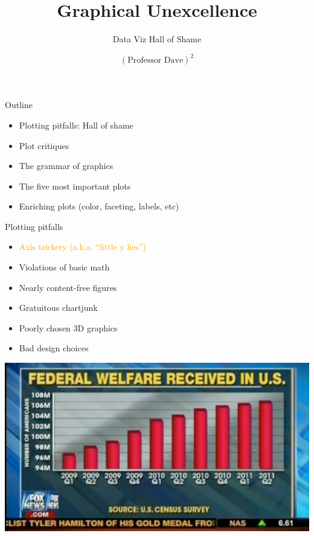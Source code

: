 \documentclass[
  ignorenonframetext,
]{beamer}
\title{Graphical Unexcellence}
\subtitle{Data Viz Hall of Shame}
\author{\((\text{Professor Dave})^2\)}
\date{}
\institute{The University of Austin}
\providecommand{\tightlist}{%
  \setlength{\itemsep}{0pt}\setlength{\parskip}{0pt}}
\begin{document}
\frame{\titlepage}

\begin{frame}{Outline}
\protect\hypertarget{outline}{}
\begin{itemize}
\tightlist
\item
  Plotting pitfalls: Hall of shame
\item
  Plot critiques
\item
  The grammar of graphics
\item
  The five most important plots
\item
  Enriching plots (color, faceting, labels, etc)
\end{itemize}
\end{frame}

\begin{frame}{Plotting pitfalls}
\protect\hypertarget{plotting-pitfalls}{}
\begin{itemize}
\tightlist
\item
  \textcolor{orange}{Axis trickery (a.k.a. “little y lies”)}
\item
  Violations of basic math
\item
  Nearly content-free figures
\item
  Gratuitous chartjunk
\item
  Poorly chosen 3D graphics
\item
  Bad design choices
\end{itemize}
\end{frame}

\begin{frame}{}
\protect\hypertarget{section}{}
\includegraphics{hallofshame_figs/fig_5.png}
\end{frame}
\end{document}
